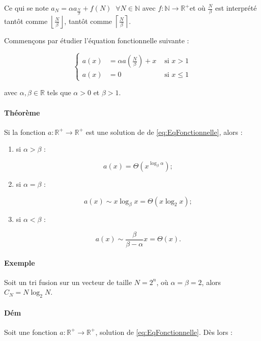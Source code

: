 \documentclass{article}
\newcommand{\floor}[1]{{\left\lfloor#1\right\rfloor}}
\newcommand{\ceil}[1]{{\left\lceil#1\right\rceil}}
\begin{document}
			Ce qui se note $a_N = \alpha a_{\frac N\beta} + f(N)\;\;\forall N \in \mathbb N$ avec $f : \mathbb N \to \mathbb R^+$et où $\frac N\beta$ est interprété
			tantôt comme $\floor{\frac N\beta}$, tantôt comme $\ceil {\frac N\beta}$.

			Commençons par étudier l'équation fonctionnelle suivante :

			\begin{equation}\label{eq:EqFonctionnelle}
				\left\{
					\begin{aligned}
						a(x) &= \alpha a\left(\frac N\beta\right) + x &\text{ si } x > 1\\
						a(x) &= 0 &\text{ si } x \leq 1
					\end{aligned}
				\right.
			\end{equation}

			avec $\alpha, \beta \in \mathbb R$ tels que $\alpha > 0$ et $\beta > 1$.

			\paragraph{Théorème} Si la fonction $a : \mathbb R^+ \to \mathbb R^+$ est une solution de de \eqref{eq:EqFonctionnelle}, alors :

			\begin{enumerate}
				\item si $\alpha > \beta$ :

					  \[a(x) = \Theta\left(x^{\log_\beta\alpha}\right) ;\]

				\item si $\alpha = \beta$ :

					  \[a(x) \sim x\log_\beta x = \Theta(x\log_2 x) ;\]

				\item si $\alpha < \beta$ :

					  \[a(x) \sim \frac \beta{\beta-\alpha}x = \Theta(x).\]
			\end{enumerate}

			\paragraph{Exemple} Soit un tri fusion sur un vecteur de taille $N = 2^n$, où $\alpha = \beta = 2$, alors $C_N = N\log_2 N$.

			\paragraph{Dém} Soit une fonction $a : \mathbb R^+ \to \mathbb R^+$, solution de \eqref{eq:EqFonctionnelle}. Dès lors :
\end{document}
